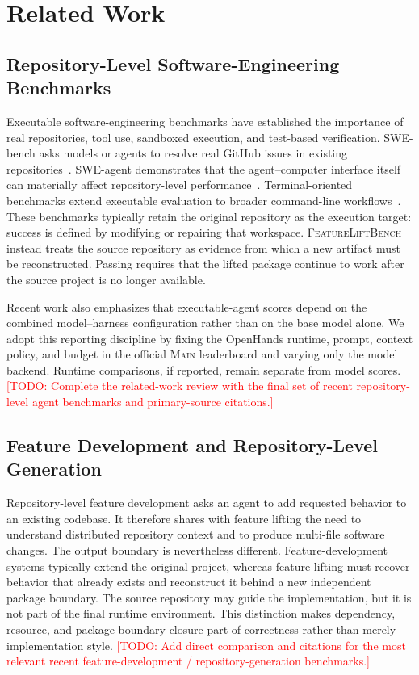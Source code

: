 \documentclass[acmsmall,screen,review,anonymous]{acmart}
\newcommand{\flb}{\textsc{FeatureLiftBench}\xspace}
\newcommand{\mainprotocol}{\textsc{Main}\xspace}
\newcommand{\draftnote}[1]{\textcolor{red}{[TODO: #1]}}
\begin{document}
\section{Related Work}
\label{sec:related-work}

\subsection{Repository-Level Software-Engineering Benchmarks}

Executable software-engineering benchmarks have established the importance of
real repositories, tool use, sandboxed execution, and test-based verification.
SWE-bench asks models or agents to resolve real GitHub issues in existing
repositories~\cite{jimenez2024swebench}. SWE-agent demonstrates that the agent--computer
interface itself can materially affect repository-level performance~\cite{yang2024sweagent}.
Terminal-oriented benchmarks extend executable evaluation to broader command-line
workflows~\cite{merrill2026terminalbench}. These benchmarks typically retain the
original repository as the execution target: success is defined by modifying or
repairing that workspace. \flb instead treats the source repository as evidence
from which a new artifact must be reconstructed. Passing requires that the lifted
package continue to work after the source project is no longer available.

Recent work also emphasizes that executable-agent scores depend on the combined
model--harness configuration rather than on the base model alone. We adopt this
reporting discipline by fixing the OpenHands runtime, prompt, context policy, and
budget in the official \mainprotocol leaderboard and varying only the model
backend. Runtime comparisons, if reported, remain separate from model scores.
\draftnote{Complete the related-work review with the final set of recent
repository-level agent benchmarks and primary-source citations.}

\subsection{Feature Development and Repository-Level Generation}

Repository-level feature development asks an agent to add requested behavior to
an existing codebase. It therefore shares with feature lifting the need to
understand distributed repository context and to produce multi-file software
changes. The output boundary is nevertheless different. Feature-development
systems typically extend the original project, whereas feature lifting must
recover behavior that already exists and reconstruct it behind a new independent
package boundary. The source repository may guide the implementation, but it is
not part of the final runtime environment. This distinction makes dependency,
resource, and package-boundary closure part of correctness rather than merely
implementation style.
\draftnote{Add direct comparison and citations for the most relevant recent
feature-development / repository-generation benchmarks.}
\end{document}
